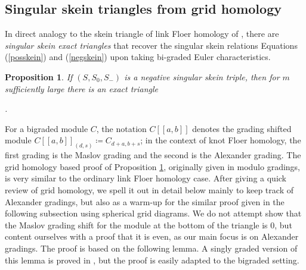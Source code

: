\documentclass[11pt]{amsart}
\newtheorem{proposition}[theorem]{Proposition}
\theoremstyle{definition}
\theoremstyle{remark}
\def\HFK {\mathit{HFK}}
\newcommand\HFKhat{\widehat{\HFK}}
\numberwithin{equation}{section}
\begin{document}
\subsection{Singular skein triangles from grid homology}\label{gridsection} 
In direct analogy to the skein triangle of link Floer homology of \cite[~Section 8]{OSknots}, there are \emph{singular skein exact triangles} that recover the singular skein relations Equations (\ref{posskein}) and (\ref{negskein}) upon taking bi-graded Euler characteristics. 
\begin{proposition}\cite[~Theorem 4.1]{OSsing2}\label{skeintriangles}
If $(S, S_0, S_-)$ is a negative singular skein triple, then for $m$ sufficiently large there is an exact triangle

\begin{center}
.
\end{center}
\end{proposition}
For a bigraded module $C$, the notation $C[[a,b]]$ denotes the grading shifted module $C[[a,b]]_{(d,s)}\coloneq C_{d+a,b+s}$; in the context of knot Floer homology, the first grading is the Maslov grading and the second is the Alexander grading.
The grid homology based proof of Proposition \ref{skeintriangles}, originally given in \cite[~Section 6]{OSsing2} modulo gradings, is very similar to the ordinary link Floer homology case. After giving a quick review of grid homology, we spell it out in detail below  mainly to keep track of Alexander gradings, but also as a warm-up for the similar proof given in the following subsection using spherical grid diagrams. We do not attempt show that the Maslov grading shift for the module at the bottom of the triangle is $0$, but content ourselves with a proof that it is even, as our main focus is on Alexander gradings. The proof is based on the following lemma. A singly graded version of this lemma is proved in \cite[~Lemma A.3.10]{OSSgridhomologybook}, but the proof is easily adapted to the bigraded setting.
\end{document}
